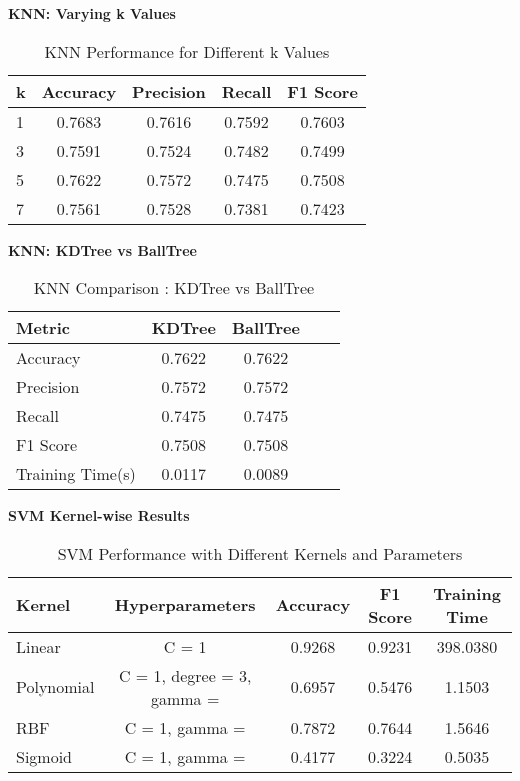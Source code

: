 \documentclass[11pt]{article}
\begin{document}
\vspace{0.5cm}
\noindent
\textbf{KNN: Varying k Values} \\
\begin{table}[h!]
\centering
\begin{tabular}{|l|c|c|c|c|}
\hline
\textbf{k} & \textbf{Accuracy} & \textbf{Precision} & \textbf{Recall} & \textbf{F1 Score}\\
\hline
1 & 0.7683 & 0.7616 & 0.7592 & 0.7603 \\
3 & 0.7591 & 0.7524 & 0.7482 & 0.7499 \\
5 & 0.7622 & 0.7572 & 0.7475 & 0.7508 \\
7 & 0.7561 & 0.7528 & 0.7381 & 0.7423 \\
\hline
\end{tabular}
\caption{KNN Performance for Different k Values}
\end{table}

\vspace{0.5cm}
\noindent
\textbf{KNN: KDTree vs BallTree} \\
\begin{table}[h!]
\centering
\begin{tabular}{|l|c|c|c|c|}
\hline
\textbf{Metric} & \textbf{KDTree} & \textbf{BallTree}\\
\hline
Accuracy & 0.7622 & 0.7622 \\
Precision & 0.7572 & 0.7572 \\
Recall & 0.7475 & 0.7475 \\
F1 Score & 0.7508 & 0.7508 \\
Training Time(s) & 0.0117 & 0.0089 \\
\hline
\end{tabular}
\caption{KNN Comparison : KDTree vs BallTree}
\end{table}

\vspace{0.5cm}
\noindent
\textbf{SVM Kernel-wise Results} \\
\begin{table}[h!]
\centering
\begin{tabular}{|l|c|c|c|c|}
\hline
\textbf{Kernel} & \textbf{Hyperparameters} & \textbf{Accuracy} & \textbf{F1 Score} & \textbf{Training Time}\\
\hline
Linear & C = 1 & 0.9268 & 0.9231 & 398.0380\\
Polynomial & C = 1, degree = 3, gamma =  & 0.6957 & 0.5476 & 1.1503\\
RBF & C = 1, gamma =  & 0.7872 & 0.7644 & 1.5646\\
Sigmoid & C = 1, gamma =  & 0.4177 & 0.3224 & 0.5035\\
\hline
\end{tabular}
\caption{SVM Performance with Different Kernels and Parameters}
\end{table}
\end{document}
